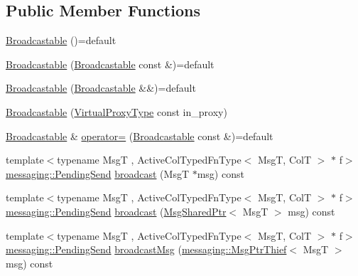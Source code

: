 \subsection*{Public Member Functions}
\begin{DoxyCompactItemize}
\item 
\hyperlink{structvt_1_1vrt_1_1collection_1_1_broadcastable_afc16bdb399c4a846fd741062d995a339}{Broadcastable} ()=default
\item 
\hyperlink{structvt_1_1vrt_1_1collection_1_1_broadcastable_ae8d8b03ad2ab2d9c74a3c2b4537ff806}{Broadcastable} (\hyperlink{structvt_1_1vrt_1_1collection_1_1_broadcastable}{Broadcastable} const \&)=default
\item 
\hyperlink{structvt_1_1vrt_1_1collection_1_1_broadcastable_ae2095333f93c2448ee62b0dd7edcebd0}{Broadcastable} (\hyperlink{structvt_1_1vrt_1_1collection_1_1_broadcastable}{Broadcastable} \&\&)=default
\item 
\hyperlink{structvt_1_1vrt_1_1collection_1_1_broadcastable_a62e91c5dfe22893acb08c01289de3941}{Broadcastable} (\hyperlink{namespacevt_a1b417dd5d684f045bb58a0ede70045ac}{Virtual\+Proxy\+Type} const in\+\_\+proxy)
\item 
\hyperlink{structvt_1_1vrt_1_1collection_1_1_broadcastable}{Broadcastable} \& \hyperlink{structvt_1_1vrt_1_1collection_1_1_broadcastable_a40df56c587e61448857f71acedce53bc}{operator=} (\hyperlink{structvt_1_1vrt_1_1collection_1_1_broadcastable}{Broadcastable} const \&)=default
\item 
{\footnotesize template$<$typename MsgT , Active\+Col\+Typed\+Fn\+Type$<$ Msg\+T, Col\+T $>$ $\ast$ f$>$ }\\\hyperlink{structvt_1_1messaging_1_1_pending_send}{messaging\+::\+Pending\+Send} \hyperlink{structvt_1_1vrt_1_1collection_1_1_broadcastable_a0a08e1ab7c78e36b3ecb5b6a4d399dab}{broadcast} (MsgT $\ast$msg) const
\item 
{\footnotesize template$<$typename MsgT , Active\+Col\+Typed\+Fn\+Type$<$ Msg\+T, Col\+T $>$ $\ast$ f$>$ }\\\hyperlink{structvt_1_1messaging_1_1_pending_send}{messaging\+::\+Pending\+Send} \hyperlink{structvt_1_1vrt_1_1collection_1_1_broadcastable_a84e88085c04b2293e019faf986a4996a}{broadcast} (\hyperlink{namespacevt_ab2b3d506ec8e8d1540aede826d84a239}{Msg\+Shared\+Ptr}$<$ MsgT $>$ msg) const
\item 
{\footnotesize template$<$typename MsgT , Active\+Col\+Typed\+Fn\+Type$<$ Msg\+T, Col\+T $>$ $\ast$ f$>$ }\\\hyperlink{structvt_1_1messaging_1_1_pending_send}{messaging\+::\+Pending\+Send} \hyperlink{structvt_1_1vrt_1_1collection_1_1_broadcastable_a520d37e5da6ce89657f6d33162a23003}{broadcast\+Msg} (\hyperlink{structvt_1_1messaging_1_1_msg_ptr_thief}{messaging\+::\+Msg\+Ptr\+Thief}$<$ MsgT $>$ msg) const

\end{DoxyCompactItemize}
